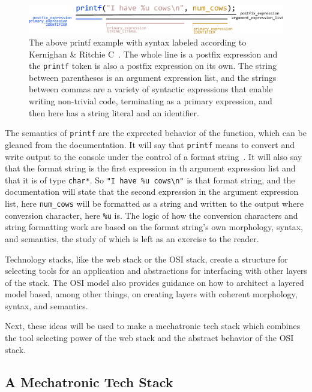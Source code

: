\documentclass[english,12pt,a4paper,pdftex,eng,utf8]{aaltothesis}
\begin{document}
\begin{figure}[h]
  \centering
  \includegraphics[width=\textwidth]{assets/printf_syntax}
  \cprotect\caption{The above printf example with syntax labeled according to Kernighan {\&} Ritchie C~\cite{Kernighan1978}.  The whole line is a postfix expression and the \verb|printf| token is also a postfix expression on its own.  The string between parentheses is an argument expression list, and the strings between commas are a variety of syntactic expressions that enable writing non-trivial code, terminating as a primary expression, and then here has a string literal and an identifier.}\label{fig:printf_syntax}
\end{figure}

The semantics of \verb|printf| are the exprected behavior of the function, which can be gleaned from the documentation. It will say that \verb|printf| means to convert and write output to the console under the control of a format string~\cite{Kernighan1978}.  It will also say that the format string is the first expression in th argument expression list and that it is of type \verb|char*|.  So \verb|"I have %u cows\n"| is that format string, and the documentation will state that the second expression in the argument expression list, here \verb|num_cows| will be formatted as a string and written to the output where conversion character, here \verb|%u| is.  The logic of how the conversion characters and string formatting work are based on the format string's own morphology, syntax, and semantics, the study of which is left as an exercise to the reader.

Technology stacks, like the web stack or the OSI stack, create a structure for selecting tools for an application and abstractions for interfacing with other layers of the stack. The OSI model also provides guidance on how to architect a layered model based, among other things, on creating layers with coherent morphology, syntax, and semantics.

Next, these ideas will be used to make a mechatronic tech stack which combines the tool selecting power of the web stack and the abstract behavior of the OSI stack.

\subsection{A Mechatronic Tech Stack}
\end{document}
